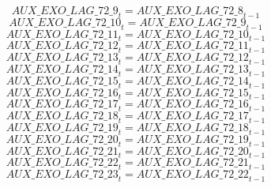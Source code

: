 \begin{dmath}
{AUX\_EXO\_LAG\_72\_9}_{t}={AUX\_EXO\_LAG\_72\_8}_{t-1}
\end{dmath}
\begin{dmath}
{AUX\_EXO\_LAG\_72\_10}_{t}={AUX\_EXO\_LAG\_72\_9}_{t-1}
\end{dmath}
\begin{dmath}
{AUX\_EXO\_LAG\_72\_11}_{t}={AUX\_EXO\_LAG\_72\_10}_{t-1}
\end{dmath}
\begin{dmath}
{AUX\_EXO\_LAG\_72\_12}_{t}={AUX\_EXO\_LAG\_72\_11}_{t-1}
\end{dmath}
\begin{dmath}
{AUX\_EXO\_LAG\_72\_13}_{t}={AUX\_EXO\_LAG\_72\_12}_{t-1}
\end{dmath}
\begin{dmath}
{AUX\_EXO\_LAG\_72\_14}_{t}={AUX\_EXO\_LAG\_72\_13}_{t-1}
\end{dmath}
\begin{dmath}
{AUX\_EXO\_LAG\_72\_15}_{t}={AUX\_EXO\_LAG\_72\_14}_{t-1}
\end{dmath}
\begin{dmath}
{AUX\_EXO\_LAG\_72\_16}_{t}={AUX\_EXO\_LAG\_72\_15}_{t-1}
\end{dmath}
\begin{dmath}
{AUX\_EXO\_LAG\_72\_17}_{t}={AUX\_EXO\_LAG\_72\_16}_{t-1}
\end{dmath}
\begin{dmath}
{AUX\_EXO\_LAG\_72\_18}_{t}={AUX\_EXO\_LAG\_72\_17}_{t-1}
\end{dmath}
\begin{dmath}
{AUX\_EXO\_LAG\_72\_19}_{t}={AUX\_EXO\_LAG\_72\_18}_{t-1}
\end{dmath}
\begin{dmath}
{AUX\_EXO\_LAG\_72\_20}_{t}={AUX\_EXO\_LAG\_72\_19}_{t-1}
\end{dmath}
\begin{dmath}
{AUX\_EXO\_LAG\_72\_21}_{t}={AUX\_EXO\_LAG\_72\_20}_{t-1}
\end{dmath}
\begin{dmath}
{AUX\_EXO\_LAG\_72\_22}_{t}={AUX\_EXO\_LAG\_72\_21}_{t-1}
\end{dmath}
\begin{dmath}
{AUX\_EXO\_LAG\_72\_23}_{t}={AUX\_EXO\_LAG\_72\_22}_{t-1}
\end{dmath}
